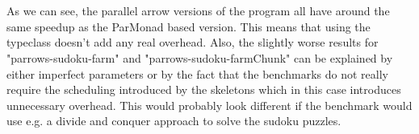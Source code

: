 \\\\
As we can see, the parallel arrow versions of the program all have around the same speedup as the ParMonad based version. This means that using the  typeclass doesn't add any real overhead. Also, the slightly worse results for "parrows-sudoku-farm" and "parrows-sudoku-farmChunk" can be explained by either imperfect parameters or by the fact that the benchmarks do not really require the scheduling introduced by the skeletons which in this case introduces unnecessary overhead. This would probably look different if the benchmark would use e.g. a divide and conquer approach to solve the sudoku puzzles.